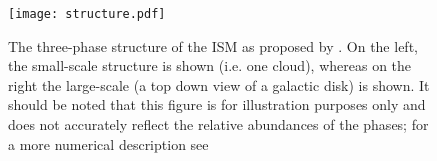 \begin{figure}
    \centering

    \texttt{[image: structure.pdf]}

    \caption{The three-phase structure of the ISM as proposed by \citet{mckee_theory_1977}.
    On the left, the small-scale structure is shown (i.e. one cloud), whereas on the right the large-scale (a top down view of a galactic disk) is shown.
    It should be noted that this figure is for illustration purposes only and does not accurately reflect the relative abundances of the phases; for a more numerical description see \citet{ferriere_interstellar_2001}}
    \label{fig:struct}
\end{figure}

